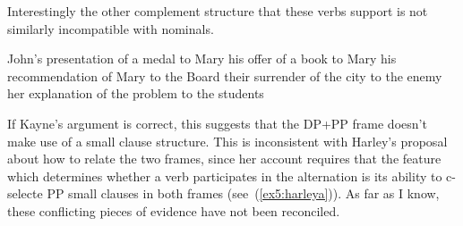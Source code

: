 Interestingly the other complement structure that these verbs support is not similarly incompatible with nominals.
\begin{exe}
	\raggedright
	\ex \label{ex5:kaynedoc} 
	\begin{xlist}
		\ex John's presentation of a medal to Mary
		\ex his offer of a book to Mary
		\ex his recommendation of Mary to the Board
		\ex their surrender of the city to the enemy
		\ex her explanation of the problem to the students
	\end{xlist}
	\hspace*{\fill} \citep[(91):~171]{Kayne:1981b} \hspace*{.5in}
\end{exe}
If Kayne's argument is correct, this suggests that the DP+PP frame doesn't make use of a small clause structure. This is inconsistent with Harley's proposal about how to relate the two frames, since her account requires that the feature which determines whether a verb participates in the alternation is its ability to c-selecte PP small clauses in both frames (see~(\ref{ex5:harleya})). As far as I know, these conflicting pieces of evidence have not been reconciled.

